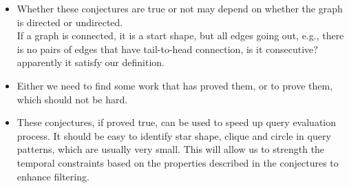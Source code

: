 \begin{itemize}
	\item Whether these conjectures are true or not may depend on whether
          the graph is directed or undirected.\\
          	If a graph is connected, it is a start shape, but all edges going out, e.g., there is no pairs of edges that have tail-to-head connection, is it consecutive? apparently it satisfy our definition. 
        
	\item Either we need to find some work that has proved them, or to prove
          them, which should not be hard.
	\item These conjectures, if proved true, can be used to speed up query
          evaluation process. It should be easy to identify star shape, clique
          and circle in query patterns, which are usually very small. This will
          allow us to strength the temporal constraints based on the properties
          described in the conjectures to enhance filtering.

\end{itemize}
